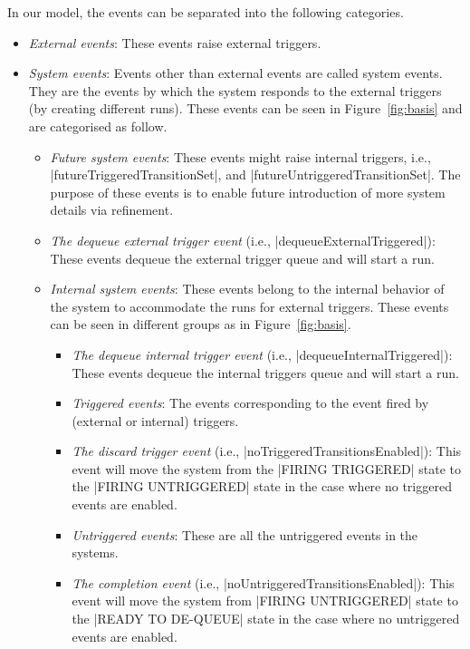 In our \EventB model, the events can be separated into the following
categories.
\begin{itemize}
\item \emph{External events}: These events raise external triggers.
  
\item \emph{System events}: Events other than external events are
  called system events. They are the events by which the system responds to
  the external triggers (by creating different runs).  These events can be
  seen in Figure~\ref{fig:basis} and are categorised as follow.
  \begin{itemize}
  \item \emph{Future system events}: These events might raise internal
    triggers, i.e., |futureTriggeredTransitionSet|, and
    |futureUntriggeredTransitionSet|.  The purpose of these events is
    to enable future introduction of more system details via refinement.
    
  \item \emph{The dequeue external trigger event} (i.e.,
    |dequeueExternalTriggered|): These events dequeue the
    external trigger queue and will start a run.

  \item \emph{Internal system events}: These events belong to the
    internal behavior of the system to accommodate the runs for external
    triggers.  These events can be seen in different groups as in
    Figure~\ref{fig:basis}.
    \begin{itemize}
    \item \emph{The dequeue internal trigger event} (i.e.,
      |dequeueInternalTriggered|): These events dequeue the
      internal triggers queue and will start a run.
    
    \item \emph{Triggered events}: The events corresponding to the
     event fired by (external or internal) triggers.

    \item \emph{The discard trigger event} (i.e.,
      |noTriggeredTransitionsEnabled|):  This event will move the system
      from the |FIRING TRIGGERED| state to the |FIRING UNTRIGGERED| state 
      in the case where no triggered events are enabled.
    
    \item \emph{Untriggered events}:  These are all the untriggered 
    events in the systems.

    \item \emph{The completion event} (i.e.,
      |noUntriggeredTransitionsEnabled|): This event will move the
      system from |FIRING UNTRIGGERED| state to the |READY TO DE-QUEUE|
      state in the case where no untriggered events are
      enabled.
    \end{itemize}
  \end{itemize}
\end{itemize}

